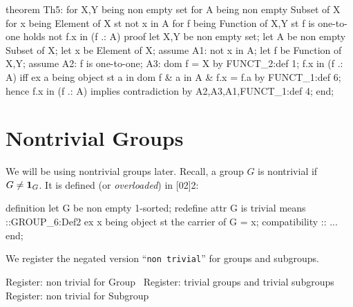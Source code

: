 \nwenddocs{}\endmoddef\nwstartdeflinemarkup{}\nwenddeflinemarkup
theorem Th5:
  for X,Y being non empty set
  for A being non empty Subset of X
  for x being Element of X
  st not x in A
  for f being Function of X,Y
  st f is one-to-one
  holds not f.x in (f .: A)
proof
  let X,Y be non empty set;
  let A be non empty Subset of X;
  let x be Element of X;
  assume A1: not x in A;
  let f be Function of X,Y;
  assume A2: f is one-to-one;
  A3: dom f = X by FUNCT_2:def 1;
  f.x in (f .: A) iff ex a being object st a in dom f & a in A & f.x = f.a
  by FUNCT_1:def 6;
  hence f.x in (f .: A) implies contradiction by A2,A3,A1,FUNCT_1:def 4;
end;
\eatline
{}\nwendcode{}\nwdocspar



\section{Nontrivial Groups}
We will be using nontrivial groups later. Recall, a group $G$ is
nontrivial if $G\neq\mathbf{1}_{G}$. It is defined (or
\emph{overloaded}) in [02]{2}:

\begin{mizar}
definition
  let G be non empty 1-sorted;
  redefine attr G is trivial means
  ::GROUP_6:Def2
  ex x being object st the carrier of G = {x};
  compatibility
  :: ...
end;
\end{mizar}

We register the negated version ``\texttt{non trivial}'' for groups and
subgroups.

\nwenddocs{}\endmoddef\nwstartdeflinemarkup{}\nwenddeflinemarkup
\LA{}Register: non trivial for Group~{\nwtagstyle{}}\RA{}
\LA{}Register: trivial groups and trivial subgroups~{\nwtagstyle{}}\RA{}
\LA{}Register: non trivial for Subgroup~{\nwtagstyle{}}\RA{}

